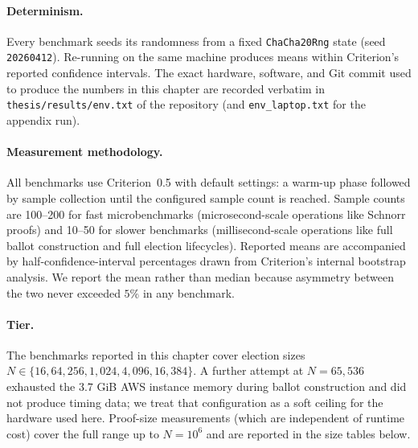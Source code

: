 \documentclass[12pt,a4paper,oneside]{report}
\begin{document}
\paragraph{Determinism.}
Every benchmark seeds its randomness from a fixed \texttt{ChaCha20Rng}
state (seed \texttt{20260412}). Re-running on the same machine produces
means within Criterion's reported confidence intervals. The exact
hardware, software, and Git commit used to produce the numbers in this
chapter are recorded verbatim in \texttt{thesis/results/env.txt} of the
repository (and \texttt{env\_laptop.txt} for the appendix run).

\paragraph{Measurement methodology.}
All benchmarks use Criterion~0.5 with default settings: a warm-up phase 
followed by sample collection until the configured sample count is 
reached. Sample counts are 100--200 for fast microbenchmarks 
(microsecond-scale operations like Schnorr proofs) and 10--50 for slower 
benchmarks (millisecond-scale operations like full ballot construction 
and full election lifecycles). Reported means are accompanied by 
half-confidence-interval percentages drawn from Criterion's internal 
bootstrap analysis. We report the mean rather than median because 
asymmetry between the two never exceeded $5\%$ in any benchmark.

\paragraph{Tier.}
The benchmarks reported in this chapter cover election sizes
$N \in \{16, 64, 256, 1{,}024, 4{,}096, 16{,}384\}$. A further attempt
at $N = 65{,}536$ exhausted the $3.7$ GiB AWS instance memory during
ballot construction and did not produce timing data; we treat that
configuration as a soft ceiling for the hardware used here. Proof-size
measurements (which are independent of runtime cost) cover the full
range up to $N = 10^6$ and are reported in the size tables below.
\end{document}
